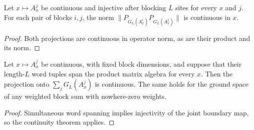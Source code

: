 \begin{lemma}
    \label{thm:continuous_fixed_window_block_overlap}

    \leanok

    Let $x\mapsto A_x^j$ be continuous and injective after blocking $L$
    sites for every $x$ and $j$. For each pair of blocks $i,j$, the norm
    $\|P_{G_L(A_x^i)}P_{G_L(A_x^j)}\|$ is continuous in $x$.
\end{lemma}
\begin{proof}
    \leanok
    Both projections are continuous in operator norm, as are their
    product and its norm.
\end{proof}

\begin{lemma}
    \label{thm:block_ground_space_projector_continuity_span}

    \leanok

    Let $x\mapsto A_x^j$ be continuous, with fixed block dimensions, and
    suppose that their length-$L$ word tuples span the product matrix
    algebra for every $x$. Then the projection onto $\sum_jG_L(A_x^j)$
    is continuous. The same holds for the ground space of any weighted
    block sum with nowhere-zero weights.
\end{lemma}
\begin{proof}
    \leanok
    Simultaneous word spanning implies injectivity of the joint boundary
    map, so the continuity theorem applies.
\end{proof}
